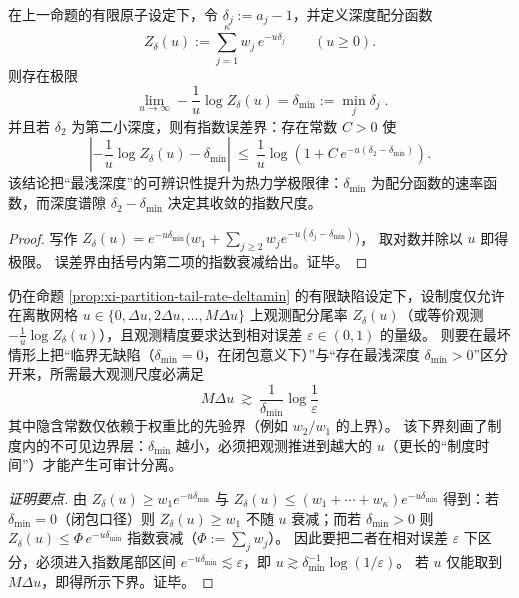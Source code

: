 \begin{proposition}\label{prop:xi-partition-tail-rate-deltamin}
在上一命题的有限原子设定下，令 \(\delta_j:=a_j-1\)，并定义深度配分函数
\[
Z_\delta(u):=\sum_{j=1}^{\kappa} w_j\,e^{-u\delta_j}\qquad(u\ge 0).
\]
则存在极限
\[
\boxed{\;
\lim_{u\to\infty}-\frac{1}{u}\log Z_\delta(u)=\delta_{\min}:=\min_j \delta_j\; }.
\]
并且若 \(\delta_2\) 为第二小深度，则有指数误差界：存在常数 \(C>0\) 使
\[
\left|-\frac{1}{u}\log Z_\delta(u)-\delta_{\min}\right|
\ \le\ \frac{1}{u}\log\!\left(1+C\,e^{-u(\delta_2-\delta_{\min})}\right).
\]
该结论把“最浅深度”的可辨识性提升为热力学极限律：\(\delta_{\min}\) 为配分函数的速率函数，而深度谱隙 \(\delta_2-\delta_{\min}\) 决定其收敛的指数尺度。
\end{proposition}
\begin{proof}
写作
\(
Z_\delta(u)=e^{-u\delta_{\min}}\bigl(w_1+\sum_{j\ge 2} w_j e^{-u(\delta_j-\delta_{\min})}\bigr)
\)，
取对数并除以 \(u\) 即得极限。
误差界由括号内第二项的指数衰减给出。证毕。
\end{proof}

\begin{corollary}\label{cor:xi-partition-tail-min-scale-lower-bound}
仍在命题 \ref{prop:xi-partition-tail-rate-deltamin} 的有限缺陷设定下，设制度仅允许在离散网格
\(
u\in\{0,\Delta u,2\Delta u,\dots,M\Delta u\}
\)
上观测配分尾率 \(Z_\delta(u)\)（或等价观测 \(-\frac{1}{u}\log Z_\delta(u)\)），且观测精度要求达到相对误差 \(\varepsilon\in(0,1)\) 的量级。
则要在最坏情形上把“临界无缺陷（\(\delta_{\min}=0\)，在闭包意义下）”与“存在最浅深度 \(\delta_{\min}>0\)”区分开来，所需最大观测尺度必满足
\[
\boxed{\;
M\Delta u\ \gtrsim\ \frac{1}{\delta_{\min}}\log\!\frac{1}{\varepsilon}\;}
\]
其中隐含常数仅依赖于权重比的先验界（例如 \(w_2/w_1\) 的上界）。
该下界刻画了制度内的不可见边界层：\(\delta_{\min}\) 越小，必须把观测推进到越大的 \(u\)（更长的“制度时间”）才能产生可审计分离。
\end{corollary}
\begin{proof}[证明要点]
由 \(Z_\delta(u)\ge w_1e^{-u\delta_{\min}}\) 与 \(Z_\delta(u)\le (w_1+\cdots+w_\kappa)e^{-u\delta_{\min}}\) 得到：若 \(\delta_{\min}=0\)（闭包口径）则 \(Z_\delta(u)\ge w_1\) 不随 \(u\) 衰减；而若 \(\delta_{\min}>0\) 则 \(Z_\delta(u)\le \Phi\,e^{-u\delta_{\min}}\) 指数衰减（\(\Phi:=\sum_j w_j\)）。
因此要把二者在相对误差 \(\varepsilon\) 下区分，必须进入指数尾部区间 \(e^{-u\delta_{\min}}\lesssim\varepsilon\)，即 \(u\gtrsim \delta_{\min}^{-1}\log(1/\varepsilon)\)。
若 \(u\) 仅能取到 \(M\Delta u\)，即得所示下界。证毕。
\end{proof}

\endinput
